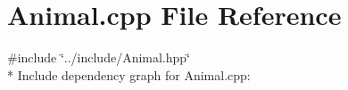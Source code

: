 \section{Animal.\+cpp File Reference}
\label{_animal_8cpp}
{\ttfamily \#include \char`\"{}../include/\+Animal.\+hpp\char`\"{}}\\*
Include dependency graph for Animal.\+cpp\+:
